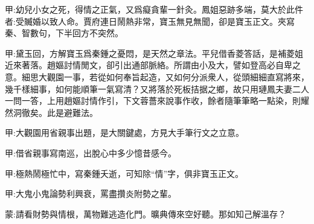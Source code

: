
\begin{parag}
    \begin{note}甲:幼兒小女之死，得情之正氣，又爲癡貪輩一針灸。鳳姐惡跡多端，莫大於此件者:受贓婚以致人命。賈府連日鬧熱非常，寶玉無見無聞，卻是寶玉正文。夾寫秦、智數句，下半回方不突然。\end{note}
\end{parag}


\begin{parag}
    \begin{note}甲:黛玉回，方解寶玉爲秦鍾之憂悶，是天然之章法。平兒借香菱答話，是補菱姐近來著落。趙嫗討情閒文，卻引出通部脈絡。所謂由小及大，譬如登高必自卑之意。細思大觀園一事，若從如何奉旨起造，又如何分派衆人，從頭細細直寫將來，幾千樣細事，如何能順筆一氣寫清？又將落於死板拮据之鄉，故只用璉鳳夫妻二人一問一答，上用趙嫗討情作引，下文蓉薔來說事作收，餘者隨筆筆略一點染，則耀然洞徹矣。此是避難法。\end{note}
\end{parag}


\begin{parag}
    \begin{note}甲:大觀園用省親事出題，是大關鍵處，方見大手筆行文之立意。\end{note}
\end{parag}


\begin{parag}
    \begin{note}甲:借省親事寫南巡，出脫心中多少憶昔感今。\end{note}
\end{parag}


\begin{parag}
    \begin{note}甲:極熱鬧極忙中，寫秦鍾夭逝，可知除“情”字，俱非寶玉正文。\end{note}
\end{parag}


\begin{parag}
    \begin{note}甲:大鬼小鬼論勢利興衰，罵盡攢炎附勢之輩。\end{note}
\end{parag}


\begin{parag}
    \begin{note}蒙:請看財勢與情根，萬物難逃造化門。曠典傳來空好聽。那如知己解溫存？\end{note}
\end{parag}


